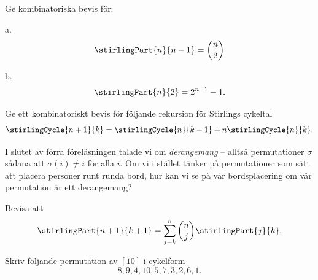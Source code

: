 \documentclass[nobib]{tufte-handout}
\begin{document}
\begin{xca}
  Ge kombinatoriska bevis för:\\ \bigskip 
  
  a. $$\stirlingPart{n}{n-1} = \binom{n}{2}$$
  
  b. $$\stirlingPart{n}{2} = 2^{n-1} - 1.$$
\end{xca}

\begin{xca}
  Ge ett kombinatoriskt bevis för följande rekursion för Stirlings cykeltal
  $$\stirlingCycle{n+1}{k} = \stirlingCycle{n}{k-1} + n\stirlingCycle{n}{k}.$$
\end{xca}

\begin{xca}
  I slutet av förra föreläsningen talade vi om \emph{derangemang} -- alltså permutationer $\sigma$ sådana att $\sigma(i) \neq i$ för alla $i$. Om vi i stället tänker på permutationer som sätt att placera personer runt runda bord, hur kan vi se på vår bordsplacering om vår permutation är ett derangemang?
\end{xca}

\begin{xca}
  Bevisa att
  $$\stirlingPart{n+1}{k+1} = \sum_{j=k}^{n} \binom{n}{j}\stirlingPart{j}{k}.$$
\end{xca}

\begin{xca}
  Skriv följande permutation av $[10]$ i cykelform
  $$8, 9, 4, 10, 5, 7, 3, 2, 6, 1.$$
\end{xca}
\end{document}
